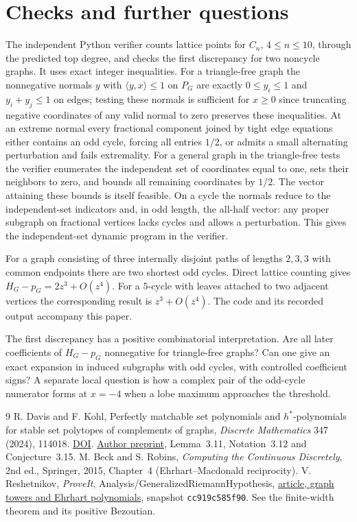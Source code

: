 \documentclass[11pt]{article}
\begin{document}
\section{Checks and further questions}
The independent Python verifier counts lattice points for $C_n$, $4\le n\le10$, through the predicted top degree, and checks the first discrepancy for two noncycle graphs. It uses exact integer inequalities. For a triangle-free graph the nonnegative normals $y$ with $\langle y,x\rangle\le1$ on $P_G$ are exactly $0\le y_i\le1$ and $y_i+y_j\le1$ on edges; testing these normals is sufficient for $x\ge0$ since truncating negative coordinates of any valid normal to zero preserves these inequalities. At an extreme normal every fractional component joined by tight edge equations either contains an odd cycle, forcing all entries $1/2$, or admits a small alternating perturbation and fails extremality. For a general graph in the triangle-free tests the verifier enumerates the independent set of coordinates equal to one, sets their neighbors to zero, and bounds all remaining coordinates by $1/2$. The vector attaining these bounds is itself feasible. On a cycle the normals reduce to the independent-set indicators and, in odd length, the all-half vector: any proper subgraph on fractional vertices lacks cycles and allows a perturbation. This gives the independent-set dynamic program in the verifier.

For a graph consisting of three internally disjoint paths of lengths $2,3,3$ with common endpoints there are two shortest odd cycles. Direct lattice counting gives $H_G-p_G=2z^3+O(z^4)$. For a $5$-cycle with leaves attached to two adjacent vertices the corresponding result is $z^3+O(z^4)$. The code and its recorded output accompany this paper.

The first discrepancy has a positive combinatorial interpretation. Are all later coefficients of $H_G-p_G$ nonnegative for triangle-free graphs? Can one give an exact expansion in induced subgraphs with odd cycles, with controlled coefficient signs? A separate local question is how a complex pair of the odd-cycle numerator forms at $x=-4$ when a lobe maximum approaches the threshold.

\small
\begin{thebibliography}{9}
 R. Davis and F. Kohl, Perfectly matchable set polynomials and $h^*$-polynomials for stable set polytopes of complements of graphs, \emph{Discrete Mathematics} 347 (2024), 114018. \href{https://doi.org/10.1016/j.disc.2024.114018}{DOI}. \href{https://arxiv.org/abs/2207.14759}{Author preprint}, Lemma~3.11, Notation~3.12 and Conjecture~3.15.
 M. Beck and S. Robins, \emph{Computing the Continuous Discretely}, 2nd ed., Springer, 2015, Chapter~4 (Ehrhart--Macdonald reciprocity).
 V. Reshetnikov, \emph{ProveIt}, Analysis/GeneralizedRiemannHypothesis,
\href{https://github.com/VladimirReshetnikov/ProveIt/blob/cc919c585f90be8e0fba7a1b90c70afdea39998e/Analysis/GeneralizedRiemannHypothesis/Article/sections/gra.tex}{article, graph towers and Ehrhart polynomials}, snapshot \texttt{cc919c585f90}. See the finite-width theorem and its positive Bezoutian.
\end{thebibliography}
\end{document}
